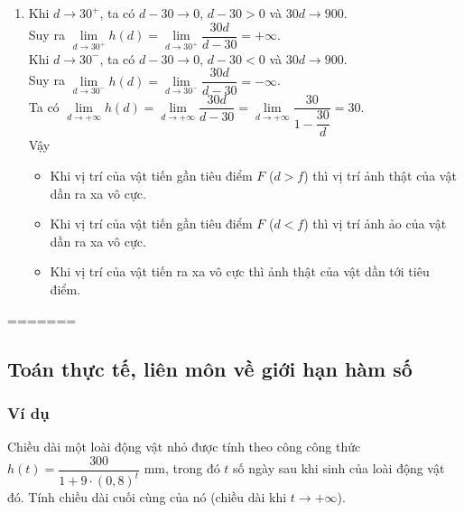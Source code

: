 \begin{bt}
{\begin{enumerate}
Vậy $d'=h(d) = \dfrac{30d}{d-30}$.
\item 
Khi $d\to 30^+$, ta có $d-30 \to 0$, $d-30 >0$ và $30d \to 900$.\\
Suy ra $\lim\limits _{d \rightarrow 30^{+}} h(d) = \lim\limits _{d \rightarrow 30^{+}} \dfrac{30d}{d-30} = +\infty$. \\
Khi $d\to 30^-$, ta có $d-30 \to 0$, $d-30 <0$ và $30d \to 900$.\\
Suy ra $\lim\limits _{d \rightarrow 30^{-}} h(d) = \lim\limits _{d \rightarrow 30^{-}} \dfrac{30d}{d-30} = -\infty$. \\
Ta có $\lim\limits _{d \rightarrow +\infty} h(d) =  \lim\limits _{d \rightarrow +\infty} \dfrac{30d}{d-30} = \lim\limits _{d \rightarrow +\infty}  \dfrac{30}{1-\dfrac{30}{d}} =30$. \\
Vậy 
\begin{itemize}
\item  Khi vị trí của vật tiến gần  tiêu điểm $F$ ($d >f$) thì vị trí ảnh thật của vật dần ra xa vô cực. 
\item  Khi vị trí của vật tiến gần  tiêu điểm $F$ ($d <f$) thì vị trí ảnh ảo của vật dần ra xa vô cực. 
\item  Khi vị trí của vật tiến ra xa vô cực thì  ảnh thật của vật dần tới tiêu điểm. 
\end{itemize}
\end{enumerate}
}
\end{bt}


=======

\subsection{Toán thực tế, liên môn về giới hạn hàm số}
\subsubsection{Ví dụ}
\begin{vd}%
Chiều dài một loài động vật nhỏ được tính theo công công thức $h(t)=\dfrac{300}{1+9 \cdot  (0{,}8)^t}$ mm, trong đó $t$ số ngày sau khi sinh của loài động vật đó. Tính chiều dài cuối cùng của nó (chiều dài khi $t \to +\infty$).
\end{vd}


